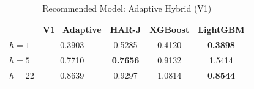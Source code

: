 \begin{table}[htbp]
\centering
\caption{Recommended Model: Adaptive Hybrid (V1)}
\label{tab:recommended}
\begin{tabular}{lcccc}
\toprule
& V1\_Adaptive & HAR-J & XGBoost & LightGBM \\
\midrule
$h=1$ & 0.3903 & 0.5285 & 0.4120 & \textbf{0.3898} \\
$h=5$ & 0.7710 & \textbf{0.7656} & 0.9132 & 1.5414 \\
$h=22$ & 0.8639 & 0.9297 & 1.0814 & \textbf{0.8544} \\
\bottomrule
\end{tabular}
\end{table}